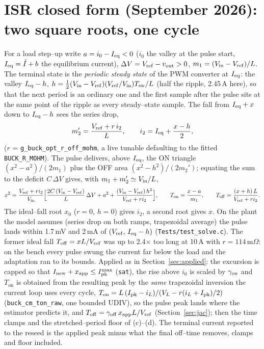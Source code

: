 \documentclass[11pt]{article}
\newcommand{\Ton}{T_{\mathrm{on}}}
\newcommand{\Toff}{T_{\mathrm{off}}}
\begin{document}
\section{ISR closed form (September 2026): two square roots, one cycle}\label{sec:isr}
For a load step--up write $a=i_0-I_{\rm eq}<0$ ($i_0$ the valley at the pulse
start, $I_{\rm eq}=\hat I+b$ the equilibrium current), $\Delta V=V_{\rm ref}-v_{\rm out}>0$,
$m_1=(V_{\rm in}-V_{\rm ref})/L$. The terminal state is the \emph{periodic steady
state} of the PWM converter at $I_{\rm eq}$: the valley $I_{\rm eq}-h$,
$h=\tfrac12(V_{\rm in}-V_{\rm ref})(V_{\rm ref}/V_{\rm in})T_{\rm sw}/L$ (half the
ripple, 2.45\,A here), so that the next period is an ordinary one and the first
sample after the pulse sits at the same point of the ripple as every steady--state
sample. The fall from $I_{\rm eq}+x$ down to $I_{\rm eq}-h$ sees the series drop,
\begin{equation}
m_2'=\frac{V_{\rm ref}+r\,i_2}{L},\qquad i_2=I_{\rm eq}+\frac{x-h}{2},
\end{equation}
($r$ = \texttt{g\_buck\_opt\_r\_off\_mohm}, a live tunable defaulting to the fitted
\texttt{BUCK\_R\_MOHM}). The pulse delivers, above $I_{\rm eq}$, the ON triangle
$(x^2-a^2)/(2m_1)$ plus the OFF area $(x^2-h^2)/(2m_2')$; equating the sum to the
deficit $C\,\Delta V$ gives, with $m_1+m_2'\simeq V_{\rm in}/L$,
\begin{equation}
x^2=\frac{V_{\rm ref}+r i_2}{V_{\rm in}}\Big[\frac{2C\,(V_{\rm in}-V_{\rm ref})}{L}\,\Delta V+a^2
+\frac{(V_{\rm in}-V_{\rm ref})\,h^2}{V_{\rm ref}+r i_2}\Big],
\qquad \Ton=\frac{x-a}{m_1},\qquad \Toff=\frac{(x+h)\,L}{V_{\rm ref}+r i_2}.
\end{equation}
The ideal--fall root $x_0$ ($r=0$, $h=0$) gives $i_2$, a second root gives $x$.
On the plant the model assumes (series drop on both ramps, trapezoidal average)
the pulse lands within 1.7\,mV and 2\,mA of $(V_{\rm ref},\,I_{\rm eq}-h)$
(\texttt{Tests/test\_solve.c}). The former ideal fall $\Toff=xL/V_{\rm ref}$ was up
to 2.4$\times$ too long at 10\,A with $r=114$\,m$\Omega$: on the bench every pulse
swung the current far below the load and the adaptation ran to its bounds. Applied as in Section~\ref{sec:applied}: the
excursion is capped so that $I_{\rm new}+x_{\rm app}\le I_{\rm pk}^{\max}$
(\texttt{sat}), the rise above $i_0$ is scaled by $\gamma_{\rm on}$ and $\Ton$ is
obtained from the resulting peak by the \emph{same} trapezoidal inversion the
current loop uses every cycle, $\Ton=L\,(I_{\rm pk}-i_L)/(V_L-r(i_L+I_{\rm pk})/2)$
(\texttt{buck\_cm\_ton\_raw}, one bounded UDIV), so the pulse peak lands where
the estimator predicts it, and $\Toff=\gamma_{\rm off}\,x_{\rm app}L/V_{\rm ref}$
(Section~\ref{sec:jac}); then the time clamps and the stretched--period floor of
(c)--(d). The terminal current reported to the reseed is the applied peak minus
what the final off--time removes, clamps and floor included.
\end{document}
